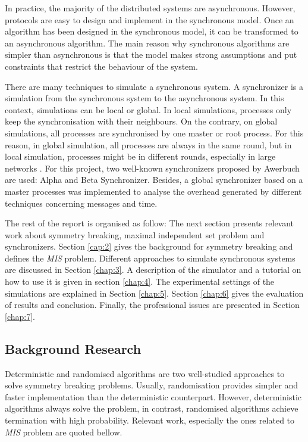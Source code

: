 In practice, the majority of the distributed systems are asynchronous. However, protocols are easy to design and implement in the synchronous model. Once an algorithm has been designed in the synchronous model, it can be transformed to an asynchronous algorithm. The main reason why synchronous algorithms are simpler than asynchronous is that the model makes strong assumptions and put constraints that restrict the behaviour of the system.

There are many techniques to simulate a synchronous system. A synchronizer is a simulation from the synchronous system to the asynchronous system. In this context, simulations can be local or global. In local simulations, processes only keep the synchronisation with their neighbours. On the contrary, on global simulations, all processes are synchronised by one master or root process.  For this reason, in global simulation, all processes are always in the same round, but in local simulation, processes might be in different rounds, especially in large networks \cite{attiya2004distributed}. For this project, two well-known synchronizers proposed by Awerbuch \cite{awerbuch1985complexity} are used: Alpha and Beta Synchronizer. Besides, a global synchronizer based on a master processes was implemented to analyse the overhead generated by different techniques concerning messages and time.


The rest of the report is organised as follow: The next section presents relevant work about symmetry breaking, maximal independent set problem and synchronizers. Section \ref{cap:2} gives the background for symmetry breaking and defines the \textit{MIS} problem. Different approaches to simulate synchronous systems are discussed in Section \ref{chap:3}. A description of the simulator and a tutorial on how to use it is given in section \ref{chap:4}. The experimental settings of the simulations are explained in Section \ref{chap:5}. Section \ref{chap:6} gives the evaluation of results and conclusion. Finally, the professional issues are presented in Section \ref{chap:7}. 

\subsection{Background Research}
 
Deterministic and randomised algorithms are two well-studied approaches to solve symmetry breaking problems. Usually, randomisation provides simpler and faster implementation than the deterministic counterpart. However, deterministic algorithms always solve the problem, in contrast, randomised algorithms achieve termination with high probability. Relevant work, especially the ones related to \textit{MIS} problem are quoted bellow.

